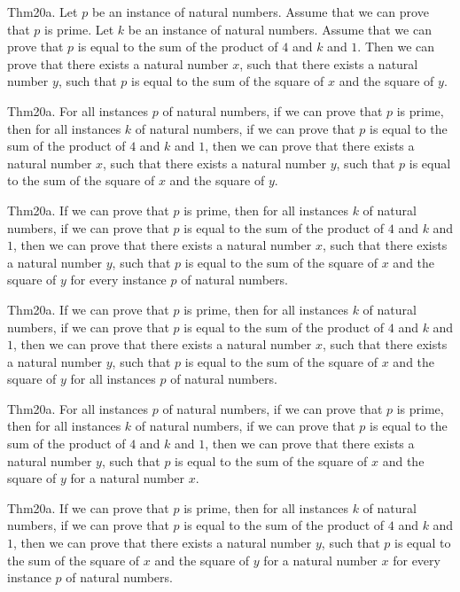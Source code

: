 \documentclass{article}
\begin{document}
Thm20a. Let $p$ be an instance of natural numbers. Assume that we can prove that $p$ is prime. Let $k$ be an instance of natural numbers. Assume that we can prove that $p$ is equal to the sum of the product of $4$ and $k$ and $1$. Then we can prove that there exists a natural number $x$, such that there exists a natural number $y$, such that $p$ is equal to the sum of the square of $x$ and the square of $y$.

Thm20a. For all instances $p$ of natural numbers, if we can prove that $p$ is prime, then for all instances $k$ of natural numbers, if we can prove that $p$ is equal to the sum of the product of $4$ and $k$ and $1$, then we can prove that there exists a natural number $x$, such that there exists a natural number $y$, such that $p$ is equal to the sum of the square of $x$ and the square of $y$.

Thm20a. If we can prove that $p$ is prime, then for all instances $k$ of natural numbers, if we can prove that $p$ is equal to the sum of the product of $4$ and $k$ and $1$, then we can prove that there exists a natural number $x$, such that there exists a natural number $y$, such that $p$ is equal to the sum of the square of $x$ and the square of $y$ for every instance $p$ of natural numbers.

Thm20a. If we can prove that $p$ is prime, then for all instances $k$ of natural numbers, if we can prove that $p$ is equal to the sum of the product of $4$ and $k$ and $1$, then we can prove that there exists a natural number $x$, such that there exists a natural number $y$, such that $p$ is equal to the sum of the square of $x$ and the square of $y$ for all instances $p$ of natural numbers.

Thm20a. For all instances $p$ of natural numbers, if we can prove that $p$ is prime, then for all instances $k$ of natural numbers, if we can prove that $p$ is equal to the sum of the product of $4$ and $k$ and $1$, then we can prove that there exists a natural number $y$, such that $p$ is equal to the sum of the square of $x$ and the square of $y$ for a natural number $x$.

Thm20a. If we can prove that $p$ is prime, then for all instances $k$ of natural numbers, if we can prove that $p$ is equal to the sum of the product of $4$ and $k$ and $1$, then we can prove that there exists a natural number $y$, such that $p$ is equal to the sum of the square of $x$ and the square of $y$ for a natural number $x$ for every instance $p$ of natural numbers.
\end{document}
